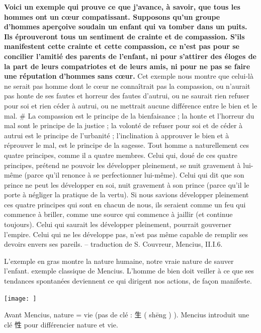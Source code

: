 \begin{singlequote}
    
\textbf{Voici un exemple qui prouve ce que j’avance, à savoir, que tous les hommes ont un cœur compatissant. Supposons qu’un groupe d’hommes aperçoive soudain un enfant qui va tomber dans un puits. Ils éprouveront tous un sentiment de crainte et de compassion. S’ils manifestent cette crainte et cette compassion, ce n’est pas pour se concilier l’amitié des parents de l’enfant, ni pour s’attirer des éloges de la part de leurs compatriotes et de leurs amis, ni pour ne pas se faire une réputation d’hommes sans cœur.}
Cet exemple nous montre que celui-là ne serait pas homme dont le cœur ne connaîtrait pas la compassion, ou n’aurait pas honte de ses fautes et horreur des fautes d’autrui, ou ne saurait rien refuser pour soi et rien céder à autrui, ou ne mettrait aucune différence entre le bien et le mal. # La compassion est le principe de la bienfaisance ; la honte et l’horreur du mal sont le principe de la justice ; la volonté de refuser pour soi et de céder à autrui est le principe de l’urbanité ; l’inclination à approuver le bien et à réprouver le mal, est le principe de la sagesse. Tout homme a naturellement ces quatre principes, comme il a quatre membres. Celui qui, doué de ces quatre principes, prétend ne pouvoir les développer pleinement, se nuit gravement à lui-même (parce qu’il renonce à se perfectionner lui-même). Celui qui dit que son prince ne peut les développer en soi, nuit gravement à son prince (parce qu’il le porte à négliger la pratique de la vertu).
Si nous savions développer pleinement ces quatre principes qui sont en chacun de nous, ils seraient comme un feu qui commence à briller, comme une source qui commence à jaillir (et continue toujours). Celui qui saurait les développer pleinement, pourrait gouverner l’empire. Celui qui ne les développe pas, n’est pas même capable de remplir ses devoirs envers ses pareils.
-- traduction de S. Couvreur, Mencius, II.I.6.  
\end{singlequote}



 
L'exemple en gras montre la nature humaine, notre vraie nature de sauver l'enfant. exemple classique de Mencius.
L'homme de bien doit veiller à ce que ses tendances spontanées deviennent ce qui dirigent nos actions, de façon manifeste. 
\begin{marginfigure}
    \texttt{[image: ]}
\end{marginfigure}
\begin{Def}[Xing 性 vs 生]
    Avant Mencius, nature = vie (pas de clé : 生 ( shēng ) ). Mencius introduit une clé  性 pour différencier nature et vie.
\end{Def}

